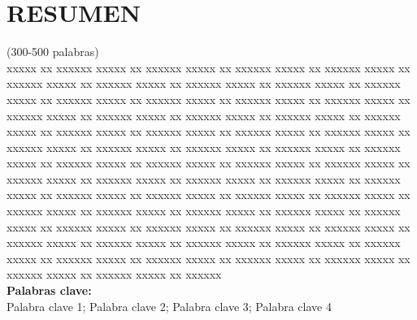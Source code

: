 \chapter*{\center \Large \vspace{-4.5cm} RESUMEN}
\noindent
(300-500 palabras)\\
xxxxx xx xxxxxx xxxxx xx xxxxxx xxxxx xx xxxxxx xxxxx xx xxxxxx xxxxx xx xxxxxx xxxxx xx xxxxxx xxxxx xx xxxxxx xxxxx xx xxxxxx xxxxx xx xxxxxx xxxxx xx xxxxxx xxxxx xx xxxxxx xxxxx xx xxxxxx xxxxx xx xxxxxx xxxxx xx xxxxxx xxxxx xx xxxxxx xxxxx xx xxxxxx xxxxx xx xxxxxx xxxxx xx xxxxxx xxxxx xx xxxxxx xxxxx xx xxxxxx xxxxx xx xxxxxx xxxxx xx xxxxxx xxxxx xx xxxxxx xxxxx xx xxxxxx xxxxx xx xxxxxx xxxxx xx xxxxxx xxxxx xx xxxxxx xxxxx xx xxxxxx xxxxx xx xxxxxx xxxxx xx xxxxxx xxxxx xx xxxxxx xxxxx xx xxxxxx xxxxx xx xxxxxx xxxxx xx xxxxxx xxxxx xx xxxxxx xxxxx xx xxxxxx xxxxx xx xxxxxx xxxxx xx xxxxxx xxxxx xx xxxxxx xxxxx xx xxxxxx xxxxx xx xxxxxx xxxxx xx xxxxxx xxxxx xx xxxxxx xxxxx xx xxxxxx xxxxx xx xxxxxx xxxxx xx xxxxxx xxxxx xx xxxxxx xxxxx xx xxxxxx xxxxx xx xxxxxx xxxxx xx xxxxxx xxxxx xx xxxxxx xxxxx xx xxxxxx xxxxx xx xxxxxx xxxxx xx xxxxxx xxxxx xx xxxxxx xxxxx xx xxxxxx xxxxx xx xxxxxx xxxxx xx xxxxxx xxxxx xx xxxxxx xxxxx xx xxxxxx xxxxx xx xxxxxx  \\

\noindent \textbf{Palabras clave:}\\
\noindent Palabra clave 1; Palabra clave 2; Palabra clave 3; Palabra clave 4